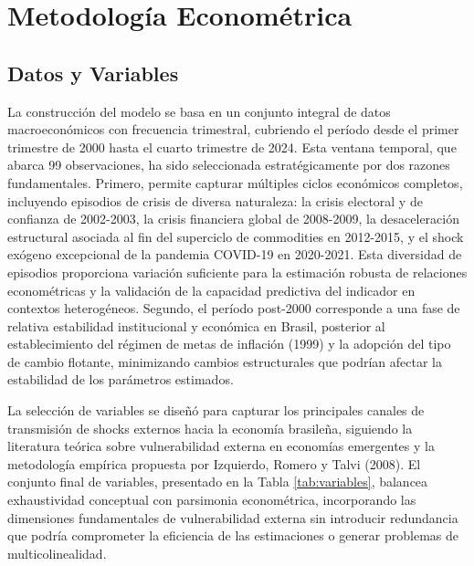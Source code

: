 \documentclass[3p,11pt,draft,natbib=false]{elsarticle}
\begin{document}
\section{Metodología Econométrica}
\label{sec:metodologia}

\subsection{Datos y Variables}
\label{sec:datos}

La construcción del modelo se basa en un conjunto integral de datos macroeconómicos con frecuencia trimestral, cubriendo el período desde el primer trimestre de 2000 hasta el cuarto trimestre de 2024. Esta ventana temporal, que abarca 99 observaciones, ha sido seleccionada estratégicamente por dos razones fundamentales. Primero, permite capturar múltiples ciclos económicos completos, incluyendo episodios de crisis de diversa naturaleza: la crisis electoral y de confianza de 2002-2003, la crisis financiera global de 2008-2009, la desaceleración estructural asociada al fin del superciclo de commodities en 2012-2015, y el shock exógeno excepcional de la pandemia COVID-19 en 2020-2021. Esta diversidad de episodios proporciona variación suficiente para la estimación robusta de relaciones econométricas y la validación de la capacidad predictiva del indicador en contextos heterogéneos. Segundo, el período post-2000 corresponde a una fase de relativa estabilidad institucional y económica en Brasil, posterior al establecimiento del régimen de metas de inflación (1999) y la adopción del tipo de cambio flotante, minimizando cambios estructurales que podrían afectar la estabilidad de los parámetros estimados.

La selección de variables se diseñó para capturar los principales canales de transmisión de shocks externos hacia la economía brasileña, siguiendo la literatura teórica sobre vulnerabilidad externa en economías emergentes y la metodología empírica propuesta por Izquierdo, Romero y Talvi (2008). El conjunto final de variables, presentado en la Tabla \ref{tab:variables}, balancea exhaustividad conceptual con parsimonia econométrica, incorporando las dimensiones fundamentales de vulnerabilidad externa sin introducir redundancia que podría comprometer la eficiencia de las estimaciones o generar problemas de multicolinealidad.
\end{document}
